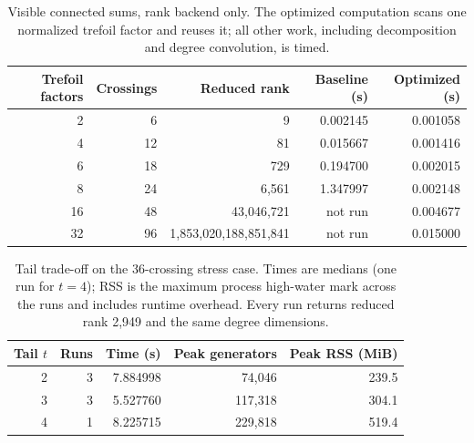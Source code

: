 \begin{table}[H]\centering\small
\begin{tabular}{@{}rrrrr@{}}\toprule
Trefoil factors & Crossings & Reduced rank & Baseline (s) & Optimized (s) \\\midrule
2 & 6 & 9 & 0.002145 & 0.001058\\
4 & 12 & 81 & 0.015667 & 0.001416\\
6 & 18 & 729 & 0.194700 & 0.002015\\
8 & 24 & 6,561 & 1.347997 & 0.002148\\
16 & 48 & 43,046,721 & not run & 0.004677\\
32 & 96 & 1,853,020,188,851,841 & not run & 0.015000\\
\bottomrule\end{tabular}
\caption{Visible connected sums, rank backend only. The optimized computation scans one normalized trefoil factor and reuses it; all other work, including decomposition and degree convolution, is timed.}\label{tab:factors}\end{table}

\begin{table}[H]\centering\small
\begin{tabular}{@{}rrrrr@{}}\toprule
Tail $t$ & Runs & Time (s) & Peak generators & Peak RSS (MiB) \\\midrule
2 & 3 & 7.884998 & 74,046 & 239.5\\
3 & 3 & 5.527760 & 117,318 & 304.1\\
4 & 1 & 8.225715 & 229,818 & 519.4\\
\bottomrule\end{tabular}
\caption{Tail trade-off on the 36-crossing stress case. Times are medians (one run for $t=4$); RSS is the maximum process high-water mark across the runs and includes runtime overhead. Every run returns reduced rank 2,949 and the same degree dimensions.}\label{tab:tails}\end{table}
